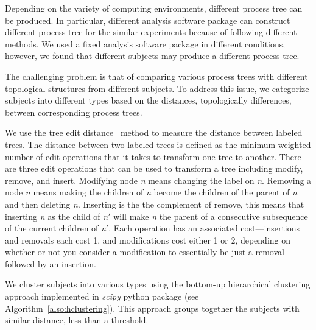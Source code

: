 \documentclass[a4paper,num-refs]{oup-contemporary}
\begin{document}
Depending on the variety of computing environments, different  
process tree can be produced. In particular, different analysis 
software package can construct different process tree for the 
similar experiments because of following different methods. We used a 
fixed analysis software package in different conditions, however, we 
found that different subjects may produce a different process tree. 

The challenging problem is that of comparing various process trees with 
different topological structures from different subjects. To address 
this issue, we categorize subjects into different types based on the 
distances, topologically differences, between corresponding process 
trees. 

We use the tree edit distance~\cite{zhang1989simple} method to measure 
the distance between labeled trees. The distance between two labeled 
trees is defined as the minimum weighted number of edit operations that 
it takes to transform one tree to another. There are three edit 
operations that can be used to transform a tree including modify, 
remove, and insert. Modifying node \textit{n} means changing the label 
on \textit{n}. Removing a node \textit{n} means making the children of 
\textit{n} become the children of the parent of \textit{n} and then 
deleting \textit{n}. Inserting is the the complement of remove, this 
means that inserting \textit{n} as the child of \textit{n}$'$ will make 
\textit{n} the parent of a consecutive subsequence of the current 
children of \textit{n}$'$.
Each operation has an associated cost---insertions and removals each 
cost 1, and modifications cost either 1 or 2, depending on whether or 
not you consider a modification to essentially be just a removal 
followed by an insertion.

We cluster subjects into various types using the bottom-up hierarchical 
clustering approach implemented in \textit{scipy} python package (see 
Algorithm~\ref{also:hclustering}). This approach groups together the 
subjects with similar distance, less than a threshold. 
\end{document}
